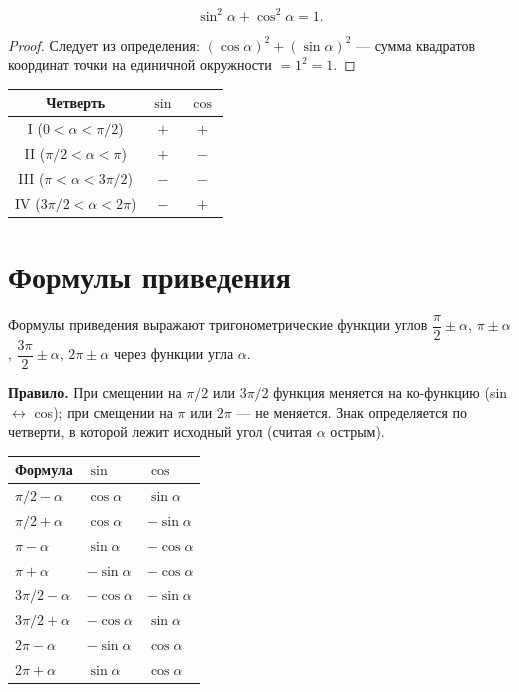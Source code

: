 \documentclass[12pt]{article}
\begin{document}
\begin{theorem}
\[
\sin^2\alpha + \cos^2\alpha = 1.
\]
\end{theorem}

\begin{proof}
Следует из определения: $(\cos\alpha)^2 + (\sin\alpha)^2$ ---
сумма квадратов координат точки на единичной окружности $= 1^2 = 1$.
\end{proof}

\begin{property}
\begin{center}
\begin{tabular}{|c|c|c|}
\hline
Четверть & $\sin$ & $\cos$ \\ \hline
I ($0 < \alpha < \pi/2$) & $+$ & $+$ \\
II ($\pi/2 < \alpha < \pi$) & $+$ & $-$ \\
III ($\pi < \alpha < 3\pi/2$) & $-$ & $-$ \\
IV ($3\pi/2 < \alpha < 2\pi$) & $-$ & $+$ \\ \hline
\end{tabular}
\end{center}
\end{property}

\section{Формулы приведения}

Формулы приведения выражают тригонометрические функции углов
$\dfrac{\pi}{2} \pm \alpha$, $\pi \pm \alpha$, $\dfrac{3\pi}{2} \pm \alpha$,
$2\pi \pm \alpha$ через функции угла $\alpha$.

\textbf{Правило.} При смещении на $\pi/2$ или $3\pi/2$ функция меняется
на ко-функцию (sin $\leftrightarrow$ cos); при смещении на $\pi$ или $2\pi$
--- не меняется. Знак определяется по четверти, в которой лежит
исходный угол (считая $\alpha$ острым).

\begin{center}
\begin{tabular}{|l|l|l|}
\hline
Формула & $\sin$ & $\cos$ \\ \hline
$\pi/2 - \alpha$ & $\cos\alpha$ & $\sin\alpha$ \\
$\pi/2 + \alpha$ & $\cos\alpha$ & $-\sin\alpha$ \\
$\pi - \alpha$ & $\sin\alpha$ & $-\cos\alpha$ \\
$\pi + \alpha$ & $-\sin\alpha$ & $-\cos\alpha$ \\
$3\pi/2 - \alpha$ & $-\cos\alpha$ & $-\sin\alpha$ \\
$3\pi/2 + \alpha$ & $-\cos\alpha$ & $\sin\alpha$ \\
$2\pi - \alpha$ & $-\sin\alpha$ & $\cos\alpha$ \\
$2\pi + \alpha$ & $\sin\alpha$ & $\cos\alpha$ \\ \hline
\end{tabular}
\end{center}
\end{document}
